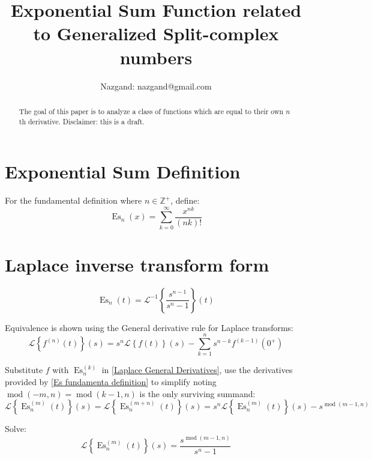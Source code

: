 \documentclass[]{article}
\title{Exponential Sum Function related to Generalized Split-complex numbers}
\author{Nazgand: nazgand@gmail.com}
\DeclareMathOperator{\es}{Es}
\DeclareMathOperator{\md}{mod}
\newcommand{\pqty}[1]{{\left(#1\right)}}
\newcommand{\Bqty}[1]{{\left\{#1\right\}}}
\newcommand{\laplace}[1]{\mathcal{L}\Bqty{#1}\pqty{s}}
\newcommand{\laplaceInv}[1]{\mathcal{L}^{-1}\Bqty{#1}\pqty{t}}
\begin{document}
	
	\maketitle
	
	\begin{abstract}
		The goal of this paper is to analyze a class of functions which are equal to their own \(n\)th derivative. Disclaimer: this is a draft.
	\end{abstract}
	
	\section{Exponential Sum Definition}
	For the fundamental definition where \(n\in\mathbb{Z}^+\), define:
	\begin{equation}
	\label{Es fundamenta definition}
	\es_n\pqty{x}=
	\sum_{k=0}^{\infty}\frac{x^{nk}}{\pqty{nk}!}
	\end{equation}
	
	\section{Laplace inverse transform form}
	\begin{equation}
	\es_n\pqty{t}=
	\laplaceInv{\frac{s^{n-1}}{s^n-1}}
	\end{equation}
	
	Equivalence is shown using the General derivative rule for Laplace transforms:
	\begin{equation}
	\label{Laplace General Derivatives}
	\laplace{f^{(n)}\pqty{t}}=
	s^n \laplace{f\pqty{t}} - \sum_{k=1}^{n} s^{n-k} f^{(k-1)}\pqty{0^{+}}
	\end{equation}
	
	Substitute \(f\) with \(\es_n^{(k)}\) in \eqref{Laplace General Derivatives}, use the derivatives provided by \eqref{Es fundamenta definition} to simplify noting \(\md\pqty{-m,n}=\md\pqty{k-1,n}\) is the only surviving summand:
	\begin{equation}
	\laplace{\es_n^{(m)}\pqty{t}}=
	\laplace{\es_n^{(m+n)}\pqty{t}}=
	s^n\laplace{\es_n^{(m)}\pqty{t}}-s^{\md\pqty{m-1,n}}
	\end{equation}
	
	Solve:
	\begin{equation}
	\laplace{\es_n^{(m)}\pqty{t}}=
	\frac{s^{\md\pqty{m-1,n}}}{s^n-1}
	\end{equation}
	
	
	
\end{document}
